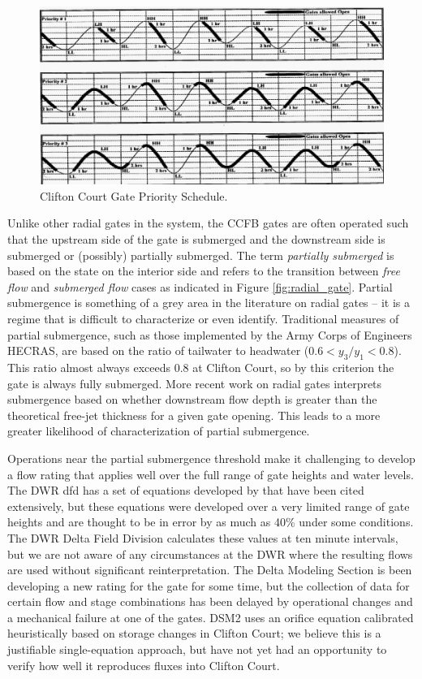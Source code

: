 \begin{figure}
	\centering
		\includegraphics{image/ccfb_priority}
	\caption{Clifton Court Gate Priority Schedule.}
	\label{fig:ccfb_priority}
\end{figure}

Unlike other radial gates in the system, the CCFB gates are often operated such that the upstream side of the gate is submerged and the downstream side is submerged or (possibly) partially submerged. The term {\em partially submerged} is based on the state on the interior side and refers to the transition between {\em free flow} and {\em submerged flow} cases as indicated in Figure \ref{fig:radial_gate}. Partial submergence is something of a grey area in the literature on radial gates -- it is a regime that is difficult to characterize or even identify. Traditional measures of partial submergence, such as those implemented by the Army Corps of Engineers HECRAS, are based on the ratio of tailwater to headwater ($0.6 < y_3/y_1 < 0.8$). This ratio almost always exceeds 0.8 at Clifton Court, so by this criterion the gate is always fully submerged. More recent work on radial gates \citep{Clemmens03,Wahl05} interprets submergence based on whether downstream flow depth is greater than the theoretical free-jet thickness for a given gate opening. This leads to a more greater likelihood of characterization of partial submergence.

Operations near the partial submergence threshold make it challenging to develop a flow rating that applies well over the full range of gate heights and water levels. The DWR \gls{dfd} has a set of equations developed by \cite{Hills1988} that have been cited extensively, but these equations were developed over a very limited range of gate heights and are thought to be in error by as much as 40\% under some conditions. The DWR Delta Field Division calculates these values at ten minute intervals, but we are not aware of any circumstances at the DWR where the resulting flows are used without significant reinterpretation. The Delta Modeling Section is been developing a new rating for the gate for some time, but the collection of data for certain flow and stage combinations has been delayed by operational changes and a mechanical failure at one of the gates. DSM2 uses an orifice equation calibrated heuristically based on storage changes in Clifton Court; we believe this is a justifiable single-equation approach, but have not yet had an opportunity to verify how well it reproduces fluxes into Clifton Court.

